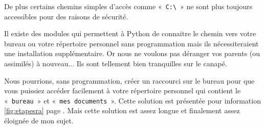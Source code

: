 De plus certains chemins simples d'accès comme « \Verb+C:\+ » ne sont plus toujours accessibles pour des raisons de sécurité.

Il existe des modules qui permettent à Python de connaitre le chemin vers votre bureau ou votre répertoire personnel sans programmation mais ils nécessiteraient une installation supplémentaire. Or nous ne voulons pas déranger vos parents (ou assimilés) à nouveau... Ils sont tellement bien tranquilles sur le canapé.

Nous pourrions, sans programmation, créer un raccourci sur le bureau pour que vous puissiez accéder facilement à votre répertoire personnel qui contient le « \texttt{bureau} »  et « \texttt{mes documents} ». Cette solution est présentée pour information \autoref{fig:etapesra} page \pageref{fig:etapesra}. Mais cette solution est assez longue et finalement assez éloignée de mon sujet.

